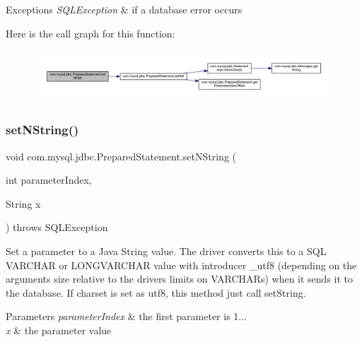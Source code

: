 \begin{DoxyExceptions}{Exceptions}
{\em S\+Q\+L\+Exception} & if a database error occurs \\
\hline
\end{DoxyExceptions}
Here is the call graph for this function\+:
\nopagebreak
\begin{figure}[H]
\begin{center}
\leavevmode
\includegraphics[width=350pt]{classcom_1_1mysql_1_1jdbc_1_1_prepared_statement_aacd4ab63c372045d3e340bccf996e227_cgraph}
\end{center}
\end{figure}
\mbox{\label{classcom_1_1mysql_1_1jdbc_1_1_prepared_statement_a8a013584b26bbffe4b3c11c283ef6efc}} 
\subsubsection{\texorpdfstring{set\+N\+String()}{setNString()}}
{\footnotesize\ttfamily void com.\+mysql.\+jdbc.\+Prepared\+Statement.\+set\+N\+String (\begin{DoxyParamCaption}\item[{int}]{parameter\+Index,  }\item[{String}]{x }\end{DoxyParamCaption}) throws S\+Q\+L\+Exception}

Set a parameter to a Java String value. The driver converts this to a S\+QL V\+A\+R\+C\+H\+AR or L\+O\+N\+G\+V\+A\+R\+C\+H\+AR value with introducer \+\_\+utf8 (depending on the arguments size relative to the driver\textquotesingle{}s limits on V\+A\+R\+C\+H\+A\+Rs) when it sends it to the database. If charset is set as utf8, this method just call set\+String.


\begin{DoxyParams}{Parameters}
{\em parameter\+Index} & the first parameter is 1... \\
\hline
{\em x} & the parameter value\\
\hline
\end{DoxyParams}

